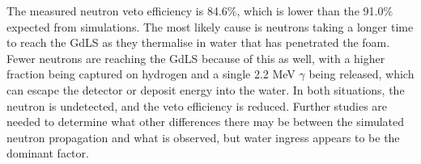 \par
The measured neutron veto efficiency is 84.6\%, which is lower than the 91.0\% expected from simulations.
The most likely cause is neutrons taking a longer time to reach the GdLS as they thermalise in water that has penetrated the foam.
Fewer neutrons are reaching the GdLS because of this as well, with a higher fraction being captured on hydrogen and a single 2.2 MeV $\gamma$ being released, which can escape the detector or deposit energy into the water.
In both situations, the neutron is undetected, and the veto efficiency is reduced.
Further studies are needed to determine what other differences there may be between the simulated neutron propagation and what is observed, but water ingress appears to be the dominant factor.



